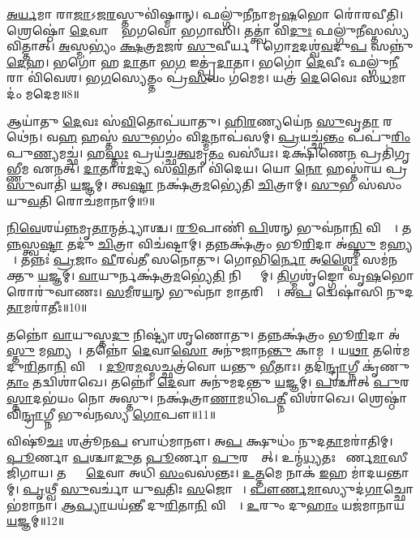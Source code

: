 \ul{𑌅}\ul{𑌰𑍍𑌯}𑌮𑌾 𑌰𑌾\ul{𑌜𑌾}\-𑌽𑌜\ul{𑌰}𑌸𑍍𑌤𑍁𑌵𑌿॑𑌷𑍍𑌮𑌾𑌨𑍍।
𑌫𑌲𑍍𑌗𑍁॑𑌨𑍀𑌨𑌾𑌮𑍃\ul{𑌷}𑌭𑍋 𑌰𑍋॑𑌰𑌵𑍀𑌤𑌿।
𑌶𑍍𑌰𑍇𑌷𑍍𑌠𑍋॑ \ul{𑌦𑍇}𑌵𑌾𑌨𑌾𑌂᳚ 𑌭𑌗𑌵𑍋 𑌭𑌗𑌾𑌸𑌿।
𑌤𑌤𑍍𑌤𑍍𑌵𑌾॑ 𑌵𑌿\ul{𑌦𑍁𑌃} 𑌫𑌲𑍍𑌗𑍁॑\ul{𑌨𑍀}𑌸𑍍𑌤𑌸𑍍𑌯॑ 𑌵𑌿𑌤𑍍𑌤𑌾𑌤𑍍।
\ul{𑌅}𑌸𑍍𑌮𑌭𑍍𑌯𑌂॑ \ul{𑌕𑍍𑌷}𑌤𑍍𑌰\ul{𑌮}𑌜𑌰॑ \ul{𑌸𑍁}𑌵𑍀𑌰𑍍𑌯𑌮𑍍᳚।
𑌗𑍋\ul{𑌮}𑌦𑌶𑍍𑌵॑\ul{𑌵}𑌦𑍁\ul{𑌪} 𑌸𑌨𑍍𑌨𑍁॑\-\ul{𑌦𑍇}𑌹।
𑌭𑌗𑍋॑ 𑌹 \ul{𑌦𑌾}𑌤𑌾 𑌭\ul{𑌗} 𑌇𑌤𑍍𑌪𑍍𑌰॑\ul{𑌦𑌾}𑌤𑌾।
𑌭𑌗𑍋॑ \ul{𑌦𑍇}𑌵𑍀𑌃 𑌫𑌲𑍍𑌗𑍁॑\ul{𑌨𑍀}𑌰𑌾 𑌵𑌿॑𑌵𑍇𑌶।
𑌭\ul{𑌗}𑌸𑍍𑌯𑍇𑌤𑍍𑌤𑌂 𑌪𑍍𑌰॑\ul{𑌸}𑌵𑌂 𑌗॑𑌮𑍇𑌮।
𑌯𑌤𑍍𑌰॑ \ul{𑌦𑍇}𑌵𑍈𑌃 𑌸॑\ul{𑌧}𑌮𑌾𑌦𑌂॑ 𑌮𑌦𑍇𑌮॥8॥

𑌆𑌯𑌾॑𑌤𑍁 \ul{𑌦𑍇}𑌵𑌃 𑌸॑\ul{𑌵𑌿}𑌤𑍋𑌪॑𑌯𑌾𑌤𑍁।
\ul{𑌹𑌿}\ul{𑌰}𑌣𑍍𑌯𑌯𑍇॑𑌨 \ul{𑌸𑍁}𑌵𑍃\ul{𑌤𑌾} 𑌰𑌥𑍇॑𑌨।
𑌵\ul{𑌹}\an{} 𑌹𑌸𑍍𑌤॑ \ul{𑌸𑍁}𑌭𑌗𑌂॑ 𑌵𑌿\ul{𑌦𑍍𑌮}𑌨𑌾𑌪॑𑌸𑌮𑍍।
\ul{𑌪𑍍𑌰}𑌯𑌚𑍍𑌛॑\ul{𑌨𑍍𑌤𑌂} 𑌪𑌪𑍁॑\ul{𑌰𑌿𑌂} 𑌪𑍁\ul{𑌣𑍍𑌯}𑌮𑌚𑍍𑌛॑।
𑌹\ul{𑌸𑍍𑌤𑌃} 𑌪𑍍𑌰𑌯॑𑌚𑍍𑌛\ul{𑌤𑍍𑌵}𑌮𑍃\ul{𑌤𑌂} 𑌵𑌸𑍀॑𑌯𑌃।
𑌦𑌕𑍍𑌷𑌿॑𑌣𑍇\ul{𑌨} 𑌪𑍍𑌰𑌤𑌿॑\-𑌗𑍃𑌭𑍍𑌣𑍀𑌮 𑌏𑌨𑌤𑍍।
\ul{𑌦𑌾}𑌤𑌾𑌰॑\ul{𑌮}𑌦𑍍𑌯 𑌸॑\ul{𑌵𑌿}𑌤𑌾 𑌵𑌿॑𑌦𑍇𑌯।
𑌯𑍋 \ul{𑌨𑍋} 𑌹𑌸𑍍𑌤𑌾॑𑌯 𑌪𑍍𑌰\ul{𑌸𑍁}𑌵𑌾𑌤𑌿॑ \ul{𑌯}𑌜𑍍𑌞𑌮𑍍।
𑌤𑍍𑌵\ul{𑌷𑍍𑌟𑌾} 𑌨𑌕𑍍𑌷॑𑌤𑍍𑌰\ul{𑌮}𑌭𑍍𑌯𑍇॑𑌤𑌿 \ul{𑌚𑌿}𑌤𑍍𑌰𑌾𑌮𑍍।
\ul{𑌸𑍁}𑌭 𑌸॑𑌸𑌂 𑌯𑍁\ul{𑌵}𑌤𑌿 𑌰𑍋𑌚॑𑌮𑌾𑌨𑌾𑌮𑍍॥9॥

\ul{𑌨𑌿}\ul{𑌵𑍇}𑌶𑌯॑\ul{𑌨𑍍𑌨}\-𑌮𑍃\ul{𑌤𑌾}𑌨𑍍𑌮𑌰𑍍𑌤𑍍𑌯𑌾॑𑌶𑍍𑌚।
\ul{𑌰𑍂}𑌪𑌾𑌣𑌿॑ \ul{𑌪𑌿}\ul{}𑌶𑌨𑍍 𑌭𑍁𑌵॑𑌨𑌾\ul{𑌨𑌿} 𑌵𑌿𑌶𑍍𑌵𑌾᳚।
𑌤\ul{𑌨𑍍𑌨}𑌸𑍍𑌤𑍍𑌵\ul{𑌷𑍍𑌟𑌾} 𑌤𑌦𑍁॑ \ul{𑌚𑌿}𑌤𑍍𑌰𑌾 𑌵𑌿𑌚॑𑌷𑍍𑌟𑌾𑌮𑍍।
𑌤𑌨𑍍𑌨𑌕𑍍𑌷॑𑌤𑍍𑌰𑌂 𑌭𑍂\ul{𑌰𑌿}𑌦𑌾 𑌅॑\ul{𑌸𑍍𑌤𑍁} 𑌮𑌹𑍍𑌯𑌮𑍍᳚।
𑌤𑌨𑍍𑌨𑌃॑ \ul{𑌪𑍍𑌰}𑌜𑌾𑌂 \ul{𑌵𑍀}𑌰𑌵॑𑌤𑍀 𑌸𑌨𑍋𑌤𑍁।
𑌗𑍋𑌭𑌿॑\ul{𑌰𑍍𑌨𑍋} 𑌅\ul{𑌶𑍍𑌵𑍈𑌃} 𑌸𑌮॑𑌨𑌕𑍍𑌤𑍁 \ul{𑌯}𑌜𑍍𑌞𑌮𑍍।
\ul{𑌵𑌾}𑌯𑍁𑌰𑍍𑌨𑌕𑍍𑌷॑𑌤𑍍𑌰\ul{𑌮}𑌭𑍍𑌯𑍇॑\ul{𑌤𑌿} 𑌨𑌿𑌷𑍍𑌟𑍍𑌯𑌾᳚𑌮𑍍।
\ul{𑌤𑌿}𑌗𑍍𑌮𑌶𑍃॑𑌙𑍍𑌗𑍋 𑌵𑍃\ul{𑌷}𑌭𑍋 𑌰𑍋𑌰𑍁॑𑌵𑌾𑌣𑌃।
\ul{𑌸}\ul{𑌮𑍀}𑌰\ul{𑌯}𑌨𑍍 𑌭𑍁𑌵॑𑌨𑌾 𑌮𑌾\ul{𑌤}𑌰𑌿𑌶𑍍𑌵𑌾᳚।
𑌅\ul{𑌪} 𑌦𑍍𑌵𑍇𑌷𑌾॑𑌸𑌿 𑌨𑍁𑌦\ul{𑌤𑌾}𑌮𑌰𑌾॑𑌤𑍀𑌃॥10॥

𑌤𑌨𑍍𑌨𑍋॑ \ul{𑌵𑌾}𑌯𑍁𑌸𑍍𑌤\ul{𑌦𑍁} 𑌨𑌿𑌷𑍍𑌟𑍍𑌯𑌾॑ 𑌶𑍃𑌣𑍋𑌤𑍁।
𑌤𑌨𑍍𑌨𑌕𑍍𑌷॑𑌤𑍍𑌰𑌂 𑌭𑍂\ul{𑌰𑌿}𑌦𑌾 𑌅॑\ul{𑌸𑍍𑌤𑍁} 𑌮𑌹𑍍𑌯𑌮𑍍᳚।
𑌤𑌨𑍍𑌨𑍋॑ \ul{𑌦𑍇}𑌵𑌾\ul{𑌸𑍋} 𑌅𑌨𑍁॑𑌜𑌾𑌨\ul{𑌨𑍍𑌤𑍁} 𑌕𑌾𑌮𑌮𑍍᳚।
𑌯\ul{𑌥𑌾} 𑌤𑌰𑍇॑𑌮 𑌦𑍁\ul{𑌰𑌿}𑌤𑌾\ul{𑌨𑌿} 𑌵𑌿𑌶𑍍𑌵𑌾᳚।
\ul{𑌦𑍂}𑌰\ul{𑌮}𑌸𑍍𑌮𑌚𑍍𑌛𑌤𑍍𑌰॑𑌵𑍋 𑌯𑌨𑍍𑌤𑍁 \ul{𑌭𑍀}𑌤𑌾𑌃।
𑌤𑌦𑌿॑\ul{𑌨𑍍𑌦𑍍𑌰𑌾}𑌗𑍍𑌨𑍀 𑌕𑍃॑𑌣𑍁\ul{𑌤𑌾𑌂} 𑌤𑌦𑍍𑌵𑌿𑌶𑌾॑𑌖𑍇।
𑌤𑌨𑍍𑌨𑍋॑ \ul{𑌦𑍇}𑌵𑌾 𑌅𑌨𑍁॑𑌮𑌦𑌨𑍍𑌤𑍁 \ul{𑌯}𑌜𑍍𑌞𑌮𑍍।
\ul{𑌪}𑌶𑍍𑌚𑌾𑌤𑍍 \ul{𑌪𑍁}𑌰\ul{𑌸𑍍𑌤𑌾}𑌦𑌭॑𑌯𑌂 𑌨𑍋 𑌅𑌸𑍍𑌤𑍁।
𑌨𑌕𑍍𑌷॑𑌤𑍍𑌰𑌾\ul{𑌣𑌾}𑌮𑌧𑌿॑𑌪\ul{𑌤𑍍𑌨𑍀} 𑌵𑌿𑌶𑌾॑𑌖𑍇।
𑌶𑍍𑌰𑍇𑌷𑍍𑌠𑌾॑𑌵𑌿\ul{𑌨𑍍𑌦𑍍𑌰𑌾}𑌗𑍍𑌨𑍀 𑌭𑍁𑌵॑𑌨𑌸𑍍𑌯 \ul{𑌗𑍋}𑌪𑍗॥11॥

𑌵𑌿𑌷𑍂॑\ul{𑌚𑌃} 𑌶𑌤𑍍𑌰𑍂॑𑌨\ul{𑌪} 𑌬𑌾𑌧॑𑌮𑌾𑌨𑍗।
𑌅\ul{𑌪} 𑌕𑍍𑌷𑍁𑌧𑌂॑ 𑌨𑍁𑌦\ul{𑌤𑌾}𑌮𑌰𑌾॑𑌤𑌿𑌮𑍍।
\ul{𑌪𑍂}𑌰𑍍𑌣𑌾 \ul{𑌪}𑌶𑍍𑌚𑌾\ul{𑌦𑍁}𑌤 \ul{𑌪𑍂}𑌰𑍍𑌣𑌾 \ul{𑌪𑍁}𑌰𑌸𑍍𑌤𑌾᳚𑌤𑍍।
𑌉𑌨𑍍𑌮॑\ul{𑌧𑍍𑌯}𑌤𑌃 𑌪𑍗᳚𑌰𑍍𑌣\ul{𑌮𑌾}𑌸𑍀 𑌜𑌿॑𑌗𑌾𑌯।
𑌤𑌸𑍍𑌯𑌾𑌂᳚ \ul{𑌦𑍇}𑌵𑌾 𑌅𑌧𑌿॑ \ul{𑌸𑌂}𑌵𑌸॑𑌨𑍍𑌤𑌃।
\ul{𑌉}\ul{𑌤𑍍𑌤}𑌮𑍇 𑌨𑌾𑌕॑ \ul{𑌇}𑌹 𑌮𑌾॑𑌦𑌯𑌨𑍍𑌤𑌾𑌮𑍍।
\ul{𑌪𑍃}𑌥𑍍𑌵𑍀 \ul{𑌸𑍁}𑌵𑌰𑍍𑌚𑌾॑ 𑌯𑍁\ul{𑌵}𑌤𑌿𑌃 \ul{𑌸}𑌜𑍋𑌷𑌾𑌃᳚।
\ul{𑌪𑍗}\ul{𑌰𑍍𑌣}\ul{𑌮𑌾}𑌸𑍍𑌯𑍁𑌦॑\ul{𑌗𑌾}𑌚𑍍𑌛𑍋𑌭॑𑌮𑌾𑌨𑌾।
\ul{𑌆}\ul{𑌪𑍍𑌯𑌾}𑌯𑌯॑𑌨𑍍𑌤𑍀 𑌦𑍁\ul{𑌰𑌿}𑌤𑌾\ul{𑌨𑌿} 𑌵𑌿𑌶𑍍𑌵𑌾᳚।
\ul{𑌉}𑌰𑍁𑌂 𑌦𑍁\ul{𑌹𑌾𑌂} 𑌯𑌜॑𑌮𑌾𑌨𑌾𑌯 \ul{𑌯}𑌜𑍍𑌞𑌮𑍍॥12॥\anuvakamend[\ul{𑌚𑌿}𑌤𑍍𑌰𑌭𑌾॑\ul{𑌨𑍁}𑌰𑍍𑌯𑌜॑𑌮𑌾𑌨𑍇 𑌦𑌧𑌾𑌤𑍁 \ul{𑌹}𑌵𑌿\ul{𑌰𑍍𑌨𑌃} 𑌪𑌾\ul{𑌥}𑌶𑍍𑌚𑍇𑌤𑍋॑ 𑌜𑍁𑌷\ul{𑌨𑍍𑌤𑌾}𑌞𑍍𑌚𑍇𑌤𑍋॑ 𑌮𑌦𑍇\ul{𑌮} 𑌰𑍋𑌚॑𑌮𑌾\ul{𑌨𑌾}𑌮𑌰𑌾॑𑌤𑍀\ul{𑌰𑍍𑌗𑍋}𑌪𑍗 \ul{𑌯}𑌜𑍍𑌞𑌮𑍍]

